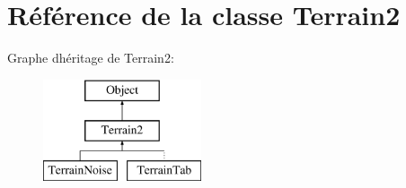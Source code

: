 \hypertarget{class_terrain2}{}\section{Référence de la classe Terrain2}
\label{class_terrain2}
Graphe d\textquotesingle{}héritage de Terrain2\+:\begin{figure}[H]
\begin{center}
\leavevmode
\includegraphics[height=3.000000cm]{class_terrain2}
\end{center}
\end{figure}
